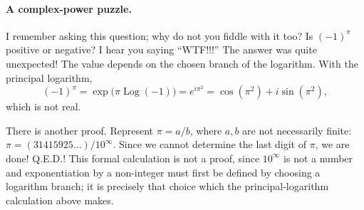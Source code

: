 \documentclass[11pt,a4paper]{article}
\begin{document}
\paragraph{A complex-power puzzle.}
I remember asking this question; why do not you fiddle with it too?
Is $(-1)^\pi$ positive or negative? I hear you saying ``WTF!!!''
The answer was quite unexpected!
The value depends on the chosen branch of the logarithm. With the principal logarithm,
\[(-1)^\pi=\exp\bigl(\pi\operatorname{Log}(-1)\bigr)=e^{i\pi^2}
=\cos(\pi^2)+i\sin(\pi^2),\]
which is not real.

There is another proof. Represent $\pi=a/b$, where $a,b$ are not necessarily finite:
$\pi=(31415925\ldots)/10^\infty$. Since we cannot determine the last digit of $\pi$, we are done! Q.E.D.!
This formal calculation is not a proof, since $10^\infty$ is not a number and
exponentiation by a non-integer must first be defined by choosing a logarithm
branch; it is precisely that choice which the principal-logarithm calculation
above makes.
\end{document}
